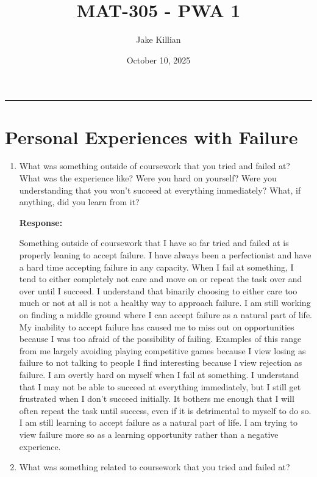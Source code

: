 \documentclass[12pt]{article} %
\title{MAT-305 - PWA 1}
\author{Jake Killian}
\date{October 10, 2025}
\numberwithin{equation}{section}
\providecommand{\PrintTitleRule}{}
\renewcommand{\PrintTitleRule}{%
    \par\medskip
    \begin{center}
        {\color{AccentColor}\rule{0.6\linewidth}{0.6pt}}%
    \end{center}
    \par\medskip
}
\begin{document}
\maketitle
\PrintTitleRule

\section{Personal Experiences with Failure}
    \begin{enumerate}[label = (\alph*)]
        \item What was something outside of coursework that you tried and failed at?
            What was the experience like?
            Were you hard on yourself?
            Were you understanding that you won't succeed at everything immediately?
            What, if anything, did you learn from it?\par
            \smallskip
            \hspace{0.5em}
            \textbf{Response:}\par
            \indent Something outside of coursework that I have so far tried and failed at is properly leaning to accept failure.
            I have always been a perfectionist and have a hard time accepting failure in any capacity.
            When I fail at something, I tend to either completely not care and move on or repeat the task over and over until I succeed.
            I understand that binarily choosing to either care too much or not at all is not a healthy way to approach failure.
            I am still working on finding a middle ground where I can accept failure as a natural part of life.
            My inability to accept failure has caused me to miss out on opportunities because I was too afraid of the possibility of failing.
            Examples of this range from me largely avoiding playing competitive games because I view losing as failure to not talking to people I find interesting because I view rejection as failure.
            I am overtly hard on myself when I fail at something.
            I understand that I may not be able to succeed at everything immediately, but I still get frustrated when I don't succeed initially.
            It bothers me enough that I will often repeat the task until success, even if it is detrimental to myself to do so.
            I am still learning to accept failure as a natural part of life.
            I am trying to view failure more so as a learning opportunity rather than a negative experience.
\pagebreak[3]
        \item What was something related to coursework that you tried and failed at?

\end{enumerate}
\end{document}
